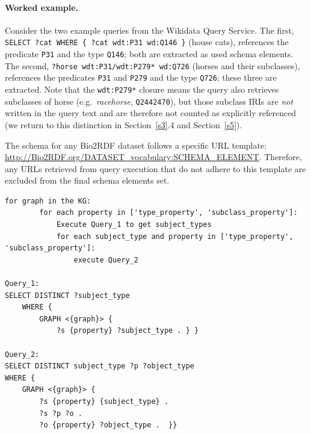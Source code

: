 \documentclass[sw]{iosart2x}
\begin{document}
\paragraph{\textbf{Worked example.}} Consider the two example queries from the Wikidata Query Service. The first, \texttt{SELECT ?cat WHERE \{ ?cat wdt:P31 wd:Q146 \}} (house cats), references the predicate \texttt{P31} and the type \texttt{Q146}; both are extracted as used schema elements. The second, \texttt{?horse wdt:P31/wdt:P279* wd:Q726} (horses and their subclasses), references the predicates \texttt{P31} and \texttt{P279} and the type \texttt{Q726}; these three are extracted. Note that the \texttt{wdt:P279*} closure means the query also retrieves subclasses of horse (e.g.\ \emph{racehorse}, \texttt{Q2442470}), but those subclass IRIs are \emph{not} written in the query text and are therefore not counted as explicitly referenced (we return to this distinction in Section~\ref{s3}.4 and Section~\ref{s5}).

The schema for any Bio2RDF dataset follows a specific URL template: \url{http://Bio2RDF.org/DATASET_vocabulary:SCHEMA_ELEMENT}. Therefore, any URLs retrieved from query execution that do not adhere to this template are excluded from the final schema elements set.


\begin{center}
\begin{minipage}{0.76\textwidth} %
\begin{lstlisting}[label={lst:l2},caption={Pseudocode to extract KG schema. KG schema extraction is consist of two queries, Query 1 and Query 2.}]
for graph in the KG:
        for each property in ['type_property', 'subclass_property']:
            Execute Query_1 to get subject_types
            for each subject_type and property in ['type_property', 'subclass_property']:
                execute Query_2 
                
Query_1:
SELECT DISTINCT ?subject_type
    WHERE {
        GRAPH <{graph}> {
            ?s {property} ?subject_type . } }

Query_2:
SELECT DISTINCT subject_type ?p ?object_type
WHERE {
    GRAPH <{graph}> {
        ?s {property} {subject_type} .
        ?s ?p ?o .
        ?o {property} ?object_type .  }} 
                    
\end{lstlisting}
\end{minipage}
\end{center}
\end{document}
